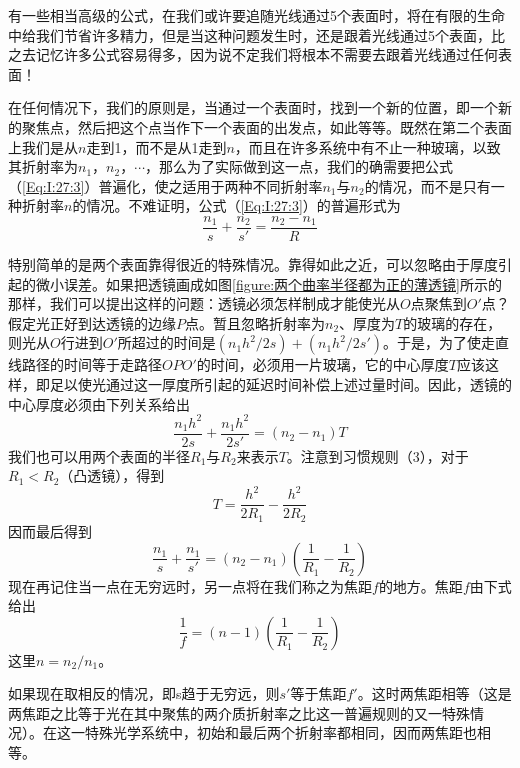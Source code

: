 有一些相当高级的公式，在我们或许要追随光线通过5个表面时，将在有限的生命中给我们节省许多精力，但是当这种问题发生时，还是跟着光线通过5个表面，比之去记忆许多公式容易得多，因为说不定我们将根本不需要去跟着光线通过任何表面！

在任何情况下，我们的原则是，当通过一个表面时，找到一个新的位置，即一个新的聚焦点，然后把这个点当作下一个表面的出发点，如此等等。既然在第二个表面上我们是从$n$走到1，而不是从1走到$n$，而且在许多系统中有不止一种玻璃，以致其折射率为$n_1$，$n_2$，$\cdots$，那么为了实际做到这一点，我们的确需要把公式（\ref{Eq:I:27:3}）普遍化，使之适用于两种不同折射率$n_1$与$n_2$的情况，而不是只有一种折射率$n$的情况。不难证明，公式（\ref{Eq:I:27:3}）的普遍形式为
\begin{equation}
    \label{Eq:I:27:7}
    \frac{n_1}{s} + \frac{n_2}{s'} = \frac{n_2-n_1}{R}
\end{equation}

特别简单的是两个表面靠得很近的特殊情况。靠得如此之近，可以忽略由于厚度引起的微小误差。如果把透镜画成如图\ref{figure:两个曲率半径都为正的薄透镜}所示的那样，我们可以提出这样的问题：透镜必须怎样制成才能使光从$O$点聚焦到$O'$点？假定光正好到达透镜的边缘$P$点。暂且忽略折射率为$n_2$、厚度为$T$的玻璃的存在，则光从$O$行进到$O'$所超过的时间是$(n_1h^2/2s)+(n_1h^2/2s')$。于是，为了使走直线路径的时间等于走路径$OPO'$的时间，必须用一片玻璃，它的中心厚度$T$应该这样，即足以使光通过这一厚度所引起的延迟时间补偿上述过量时间。因此，透镜的中心厚度必须由下列关系给出
\begin{equation}
    \label{Eq:I:27:8}
    \frac{n_1h^2}{2s} + \frac{n_1h^2}{2s'} = (n_2 - n_1)T
\end{equation}
我们也可以用两个表面的半径$R_1$与$R_2$来表示$T$。注意到习惯规则（3），对于$R_1<R_2$（凸透镜），得到
\begin{equation}
    \label{Eq:I:27:9}
    T=\frac{h^2}{2R_1} - \frac{h^2}{2R_2}
\end{equation}
因而最后得到
\begin{equation}
    \label{Eq:I:27:10}
    \frac{n_1}{s} + \frac{n_1}{s'} = (n_2-n_1)\left ( \frac{1}{R_1}-\frac{1}{R_2} \right )
\end{equation}
现在再记住当一点在无穷远时，另一点将在我们称之为焦距$f$的地方。焦距$f$由下式给出
\begin{equation}
    \label{Eq:I:27:11}
    \frac{1}{f} = (n-1)\left ( \frac{1}{R_1}-\frac{1}{R_2} \right )
\end{equation}
这里$n=n_2/n_1$。

如果现在取相反的情况，即s趋于无穷远，则$s'$等于焦距$f'$。这时两焦距相等（这是两焦距之比等于光在其中聚焦的两介质折射率之比这一普遍规则的又一特殊情况）。在这一特殊光学系统中，初始和最后两个折射率都相同，因而两焦距也相等。

